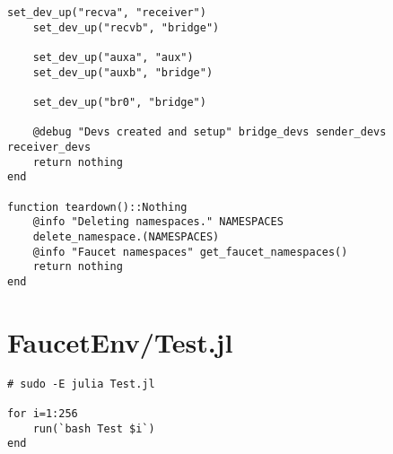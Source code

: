 \begin{lstlisting}[language=JuliaLocal, style=julia]
    set_dev_up("recva", "receiver")
    set_dev_up("recvb", "bridge")
    
    set_dev_up("auxa", "aux")
    set_dev_up("auxb", "bridge")

    set_dev_up("br0", "bridge")

    @debug "Devs created and setup" bridge_devs sender_devs receiver_devs 
    return nothing
end

function teardown()::Nothing
    @info "Deleting namespaces." NAMESPACES
    delete_namespace.(NAMESPACES)
    @info "Faucet namespaces" get_faucet_namespaces()
    return nothing
end

\end{lstlisting}
\section{FaucetEnv/Test.jl}
\begin{lstlisting}[language=JuliaLocal, style=julia]
# sudo -E julia Test.jl

for i=1:256
    run(`bash Test $i`)
end

\end{lstlisting}
